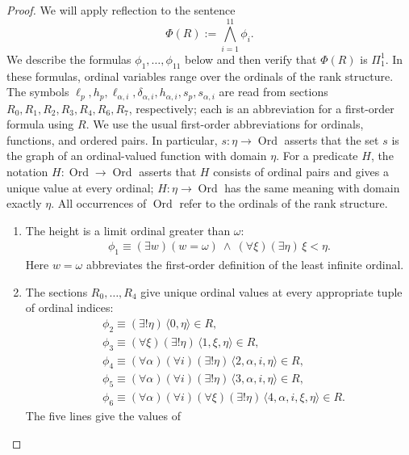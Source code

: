 \documentclass[10pt,a4paper]{amsart}
\theoremstyle{definition}
\theoremstyle{remark}
\DeclareMathOperator{\Ord}{Ord}
\begin{document}
\begin{proof}
We will apply reflection to the sentence
\[
 \Phi(R):=\bigwedge_{i=1}^{11}\phi_i.
\]
We describe the formulas \(\phi_1,\ldots,\phi_{11}\) below
and then verify that \(\Phi(R)\) is \(\Pi^1_1\).
In these formulas, ordinal variables range over the ordinals of the
rank structure. The symbols
\(\ell_p,\allowbreak h_p,\allowbreak\ell_{\alpha,i},\allowbreak
\delta_{\alpha,i},\allowbreak h_{\alpha,i},\allowbreak s_p,\allowbreak s_{\alpha,i}\) are read from sections \(R_0,\allowbreak R_1,\allowbreak R_2,\allowbreak R_3,
\allowbreak R_4,\allowbreak R_6,\allowbreak R_7\), respectively;
each is an abbreviation for a first-order formula using \(R\).
We use the usual first-order abbreviations for
ordinals, functions, and ordered pairs. In particular,
\(s:\eta\to\Ord\) asserts that the set \(s\) is the graph
of an ordinal-valued function with domain \(\eta\).
For a predicate \(H\), the notation \(H:\Ord\to\Ord\)
asserts that \(H\) consists of ordinal pairs and gives a
unique value at every ordinal; \(H:\eta\to\Ord\) has the
same meaning with domain exactly \(\eta\). All occurrences
of \(\Ord\) refer to the ordinals of the rank structure.
\begin{enumerate}[label=\textup{(\alph*)}]
\item The height is a limit ordinal greater than \(\omega\):
\[
\begin{aligned}
\phi_{1}\equiv (\exists w)(w=\omega)\ \land\
 (\forall\xi)(\exists\eta)\,\xi<\eta.
\end{aligned}
\]
Here \(w=\omega\) abbreviates the first-order definition
of the least infinite ordinal.
\item The sections \(R_0,\ldots,R_4\) give unique ordinal
values at every appropriate tuple of ordinal indices:
\[
\begin{aligned}
 &\phi_2 \equiv (\exists!\eta)\,\langle0,\eta\rangle\in R,\\
 &\phi_3 \equiv (\forall\xi)(\exists!\eta)\,
                         \langle1,\xi,\eta\rangle\in R,\\
 &\phi_4 \equiv (\forall\alpha)(\forall i)(\exists!\eta)\,
                         \langle2,\alpha,i,\eta\rangle\in R,\\
 &\phi_5 \equiv (\forall\alpha)(\forall i)(\exists!\eta)\,
                         \langle3,\alpha,i,\eta\rangle\in R,\\
 &\phi_6 \equiv (\forall\alpha)(\forall i)(\forall\xi)(\exists!\eta)\,
                         \langle4,\alpha,i,\xi,\eta\rangle\in R.
\end{aligned}
\]
The five lines give the values of

\end{enumerate}
\end{proof}
\end{document}
